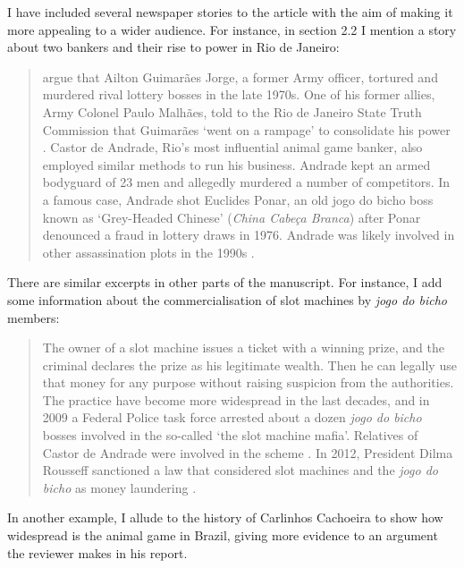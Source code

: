 \documentclass[a4paper,12pt]{article}
\begin{document}
\vspace{.25cm}

I have included several newspaper stories to the article with the aim of making it more appealing to a wider audience. For instance, in section 2.2 I mention a story about two bankers and their rise to power in Rio de Janeiro:

\begin{quote}
	\citet{jupiara2015poroes} argue that Ailton Guimarães Jorge, a former Army officer, tortured and murdered rival lottery bosses in the late 1970s. One of his former allies, Army Colonel Paulo Malhães, told to the Rio de Janeiro State Truth Commission that Guimarães `went on a rampage' to consolidate his power \citep{belem2015guimaraes}. Castor de Andrade, Rio's most influential animal game banker, also employed similar methods to run his business. Andrade kept an armed bodyguard of 23 men and allegedly murdered a number of competitors. In a famous case, Andrade shot Euclides Ponar, an old jogo do bicho boss known as `Grey-Headed Chinese' (\textit{China Cabeça Branca}) after Ponar denounced a fraud in lottery draws in 1976. Andrade was likely involved in other assassination plots in the 1990s \citep{globo2017castor}.
\end{quote}

There are similar excerpts in other parts of the manuscript. For instance, I add some information about the commercialisation of slot machines by \textit{jogo do bicho} members: 

\begin{quote}
	The owner of a slot machine issues a ticket with a winning prize, and the criminal declares the prize as his legitimate wealth. Then he can legally use that money for any purpose without raising suspicion from the authorities. The practice have become more widespread in the last decades, and in 2009 a Federal Police task force arrested about a dozen \textit{jogo do bicho} bosses involved in the so-called `the slot machine mafia'. Relatives of Castor de Andrade were involved in the scheme \citep{estado2011cacaniquel}. In 2012, President Dilma Rousseff sanctioned a law that considered slot machines and the \textit{jogo do bicho} as money laundering \citep{agenciabrasil2012dilma}.
\end{quote}

In another example, I allude to the history of Carlinhos Cachoeira to show how widespread is the animal game in Brazil, giving more evidence to an argument the reviewer makes in his report.
\end{document}
